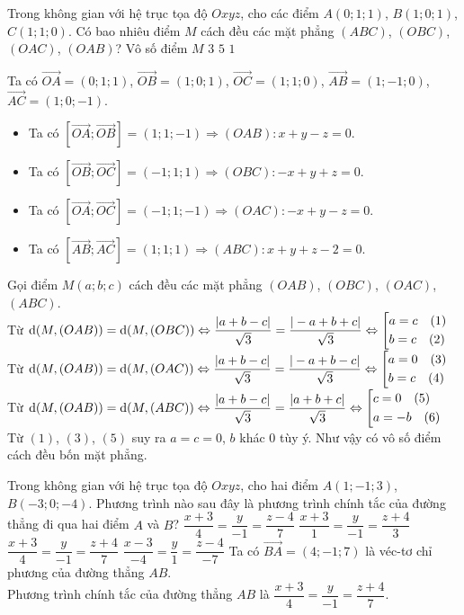 \begin{ex}%
	Trong không gian với hệ trục tọa độ $Oxyz$, cho các điểm $A(0;1;1)$, $B(1;0;1)$, $C(1;1;0)$. Có bao nhiêu điểm $M$ cách đều các mặt phẳng $(ABC)$, $(OBC)$, $(OAC)$, $(OAB)$?
	\choice
	{\True Vô số điểm $M$}
	{$3$}
	{$5$}
	{$1$}
	\loigiai
	{
		Ta có $\overrightarrow{OA}=(0;1;1)$, $\overrightarrow{OB}=(1;0;1)$, $\overrightarrow{OC}=(1;1;0)$, $\overrightarrow{AB}=(1;-1;0)$, $\overrightarrow{AC}=(1;0;-1)$.
		\begin{itemize}
			\item Ta có $\left[\overrightarrow{OA};\overrightarrow{OB}\right]=(1;1;-1)\Rightarrow (OAB)\colon x+y-z=0.$
			\item Ta có  $\left[\overrightarrow{OB};\overrightarrow{OC}\right]=(-1;1;1)\Rightarrow (OBC)\colon -x+y+z=0.$
			\item Ta có  $\left[\overrightarrow{OA};\overrightarrow{OC}\right]=(-1;1;-1)\Rightarrow (OAC)\colon -x+y-z=0.$
			\item Ta có  $\left[\overrightarrow{AB};\overrightarrow{AC}\right]=(1;1;1)\Rightarrow (ABC)\colon x+y+z-2=0.$
		\end{itemize}
		Gọi điểm $M(a;b;c)$ cách đều các mặt phẳng $(OAB)$, $(OBC)$, $(OAC)$, $(ABC)$.\\
		Từ ${\rm d}(M,(OAB))={\rm d}(M,(OBC))\Leftrightarrow \dfrac{|a+b-c|}{\sqrt{3}}=\dfrac{|-a+b+c|}{\sqrt{3}}\Leftrightarrow \left[\begin{aligned}&a=c\quad(1)\\&b=c\quad(2)\end{aligned}\right.$\\
		Từ ${\rm d}(M,(OAB))={\rm d}(M,(OAC))\Leftrightarrow \dfrac{|a+b-c|}{\sqrt{3}}=\dfrac{|-a+b-c|}{\sqrt{3}}\Leftrightarrow \left[\begin{aligned}&a=0\quad(3)\\&b=c\quad(4)\end{aligned}\right.$\\
		Từ ${\rm d}(M,(OAB))={\rm d}(M,(ABC))\Leftrightarrow \dfrac{|a+b-c|}{\sqrt{3}}=\dfrac{|a+b+c|}{\sqrt{3}}\Leftrightarrow \left[\begin{aligned}&c=0\quad(5)\\&a=-b\quad(6)\end{aligned}\right.$\\
		Từ $(1)$, $(3)$, $(5)$ suy ra $a=c=0$, $b$ khác $0$ tùy ý. Như vậy có vô số điểm cách đều bốn mặt phẳng.
	}
\end{ex}

\begin{ex}%
	Trong không gian với hệ trục tọa độ $Oxyz$, cho hai điểm $A(1;-1;3)$, $B(-3;0;-4)$. Phương trình nào sau đây là phương trình chính tắc của đường thẳng đi qua hai điểm $A$ và $B$?
	\choice
	{$\dfrac{x+3}{4}=\dfrac{y}{-1}=\dfrac{z-4}{7}$}
	{$\dfrac{x+3}{1}=\dfrac{y}{-1}=\dfrac{z+4}{3}$}
	{\True $\dfrac{x+3}{4}=\dfrac{y}{-1}=\dfrac{z+4}{7}$}
	{$\dfrac{x-3}{-4}=\dfrac{y}{1}=\dfrac{z-4}{-7}$}
	\loigiai
	{
		Ta có $\overrightarrow{BA}=(4;-1;7)$ là véc-tơ chỉ phương của đường thẳng $AB$.\\
		Phương trình chính tắc của đường thẳng $AB$ là $\dfrac{x+3}{4}=\dfrac{y}{-1}=\dfrac{z+4}{7}.$
	}
\end{ex}

